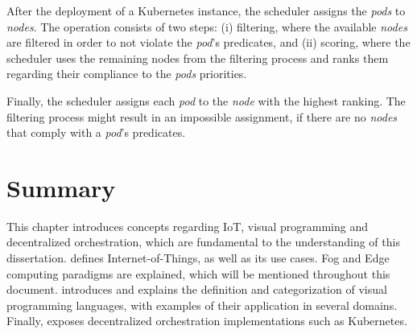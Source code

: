 After the deployment of a Kubernetes instance, the scheduler assigns the \textit{pods} to \textit{nodes}. The operation consists of two steps: (i) filtering, where the available \textit{nodes} are filtered in order to not violate the \textit{pod}'s predicates, and (ii) scoring, where the scheduler uses the remaining nodes from the filtering process and ranks them regarding their compliance to the \textit{pods} priorities. 

Finally, the scheduler assigns each \textit{pod} to the \textit{node} with the highest ranking. The filtering process might result in an impossible assignment, if there are no \textit{nodes} that comply with a \textit{pod}'s predicates. 

\section{Summary}

This chapter introduces concepts regarding IoT, visual programming and decentralized orchestration, which are fundamental to the understanding of this dissertation.  defines Internet-of-Things, as well as its use cases. Fog and Edge computing paradigms are explained, which will be mentioned throughout this document.  introduces and explains the definition and categorization of visual programming languages, with examples of their application in several domains. Finally,  exposes decentralized orchestration implementations such as Kubernetes.
